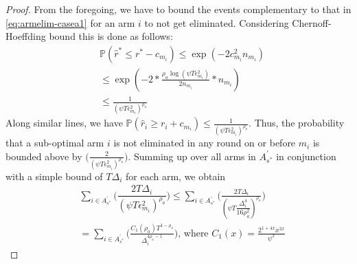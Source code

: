 \begin{proof}
From the foregoing, we have to bound the events complementary to that in \eqref{eq:armelim-casea1} for an arm $i$ to not get eliminated. Considering Chernoff-Hoeffding bound this is done as follows:
  \begin{align*}
&\mathbb{P}\left(\hat{r}^{*}\leq r^{*} - c_{m_{i}}\right)\leq \exp(-2c_{m_{i}}^{2}n_{m_{i}})\\
&\leq \exp(-2 * \frac{\rho_{a}\log (\psi T\epsilon_{m_{i}}^{2})}{2 n_{m_{i}}} *n_{m_{i}})\\
&\leq \frac{1}{(\psi T\epsilon_{m_{i}}^{2})^{\rho_{a}}}   
  \end{align*}
Along similar lines, we have 
$\mathbb{P}\left(\hat{r}_{i}\geq r_{i} + c_{m_{i}}\right)\leq \frac{1}{(\psi  T\epsilon_{m_{i}}^{2})^{\rho_{a}}}.$
Thus, the probability that a sub-optimal arm ${i}$ is not eliminated in any round on or before $m_{i}$ is bounded above by  $\bigg(\frac{2}{(\psi T\epsilon_{m_{i}}^{2})^{\rho_{a}}}\bigg)$. 
 Summing up over all arms in $A_{s^{*}}^{'}$ in conjunction with a simple bound of $T\Delta_{i}$ for each arm, we obtain
   \begin{align*}
&\sum_{i\in A_{s^{*}}^{'}}\bigg(\dfrac{2T\Delta_{i}}{(\psi T\epsilon_{m_{i}}^{2})^{\rho_{a}}}\bigg)
\leq\sum_{i\in A_{s^{*}}^{'}}\bigg(\frac{2T\Delta_{i}}{(\psi T\dfrac{\Delta_{i}^{4}}{16\rho_{a}^{2}})^{\rho_{a}}}\bigg)\\
& =\sum_{i\in A_{s^{*}}^{'}}\bigg(\frac{C_{1}(\rho_{a})T^{1-\rho_{a}}}{\Delta_{i}^{4\rho_{a}-1}}\bigg) \text{, where } C_1(x) = \frac{2^{1+4x}x^{2x}}{\psi^{x}}
   \end{align*}


\end{proof}
